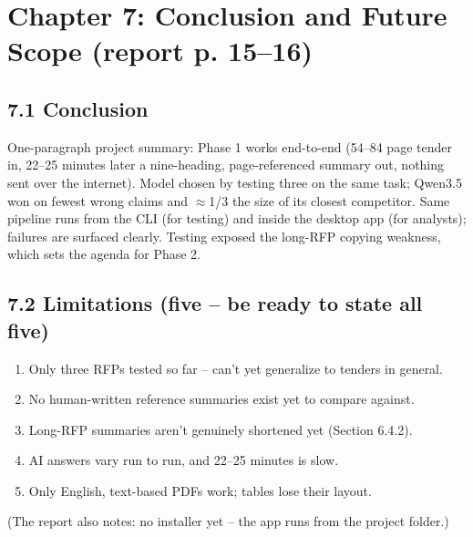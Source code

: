 \documentclass[11pt,a4paper]{article}
\begin{document}
\newpage
\section{Chapter 7: Conclusion and Future Scope (report p. 15--16)}

\subsection*{7.1 Conclusion}
One-paragraph project summary: Phase 1 works end-to-end (54--84 page tender in, 22--25 minutes later
a nine-heading, page-referenced summary out, nothing sent over the internet). Model chosen by testing
three on the same task; Qwen3.5 won on fewest wrong claims and $\approx$1/3 the size of its closest
competitor. Same pipeline runs from the CLI (for testing) and inside the desktop app (for analysts);
failures are surfaced clearly. Testing exposed the long-RFP copying weakness, which sets the agenda
for Phase 2.

\subsection*{7.2 Limitations (five -- be ready to state all five)}
\begin{enumerate}[leftmargin=1.4cm]
  \item Only three RFPs tested so far -- can't yet generalize to tenders in general.
  \item No human-written reference summaries exist yet to compare against.
  \item Long-RFP summaries aren't genuinely shortened yet (Section 6.4.2).
  \item AI answers vary run to run, and 22--25 minutes is slow.
  \item Only English, text-based PDFs work; tables lose their layout.
\end{enumerate}
(The report also notes: no installer yet -- the app runs from the project folder.)
\end{document}
